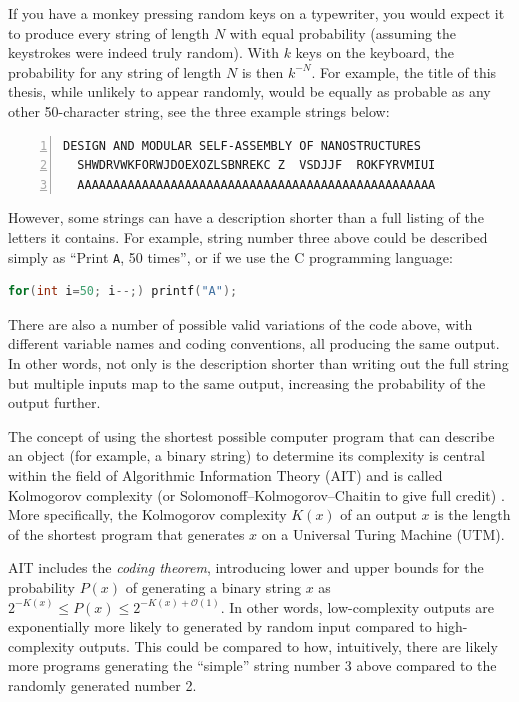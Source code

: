 
If you have a monkey pressing random keys on a typewriter, you would expect it to produce every string of length \(N\) with equal probability (assuming the keystrokes were indeed truly random). With \(k\) keys on the keyboard, the probability for any string of length \(N\) is then \(k^{-N}\). For example, the title of this thesis, while unlikely to appear randomly, would be equally as probable as any other 50-character string, see the three example strings below:
\begin{lstlisting}[numbers=left]
  DESIGN AND MODULAR SELF-ASSEMBLY OF NANOSTRUCTURES
  SHWDRVWKFORWJDOEXOZLSBNREKC Z  VSDJJF  ROKFYRVMIUI
  AAAAAAAAAAAAAAAAAAAAAAAAAAAAAAAAAAAAAAAAAAAAAAAAAA
\end{lstlisting}

However, some strings can have a description shorter than a full listing of the letters it contains. For example, string number three above could be described simply as ``Print \texttt{A}, 50 times'', or if we use the C programming language:

\begin{lstlisting}[language=c]
for(int i=50; i--;) printf("A");
\end{lstlisting}

There are also a number of possible valid variations of the code above, with different variable names and coding conventions, all producing the same output. In other words, not only is the description shorter than writing out the full string but multiple inputs map to the same output, increasing the probability of the output further.

The concept of using the shortest possible computer program that can describe an object (for example, a binary string) to determine its complexity is central within the field of Algorithmic Information Theory (AIT) and is called Kolmogorov complexity (or Solomonoff–Kolmogorov–Chaitin to give full credit) \cite{LiMing2019AitK}. More specifically, the Kolmogorov complexity \(K(x)\) of an output \(x\) is the length of the shortest program that generates \(x\) on a Universal Turing Machine (UTM).

AIT includes the \emph{coding theorem}, introducing lower and upper bounds for the probability \(P(x)\) of generating a binary string \(x\) as \(2^{-K(x)} \le P(x) \le 2^{-K(x) + \mathcal{O} (1)}\). In other words, low-complexity outputs are exponentially more likely to generated by random input compared to high-complexity outputs. This could be compared to how, intuitively, there are likely more programs generating the ``simple'' string number 3 above compared to the randomly generated number 2.

